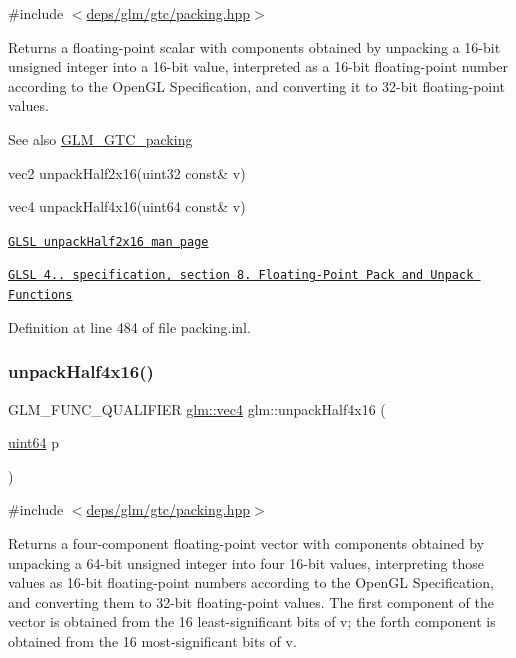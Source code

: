 {\ttfamily \#include $<$\hyperlink{gtc_2packing_8hpp}{deps/glm/gtc/packing.\+hpp}$>$}

Returns a floating-\/point scalar with components obtained by unpacking a 16-\/bit unsigned integer into a 16-\/bit value, interpreted as a 16-\/bit floating-\/point number according to the Open\+GL Specification, and converting it to 32-\/bit floating-\/point values.

\begin{DoxySeeAlso}{See also}
\hyperlink{group__gtc__packing}{G\+L\+M\+\_\+\+G\+T\+C\+\_\+packing} 

vec2 unpack\+Half2x16(uint32 const\& v) 

vec4 unpack\+Half4x16(uint64 const\& v) 

\href{http://www.opengl.org/sdk/docs/manglsl/xhtml/unpackHalf2x16.xml}{\tt G\+L\+SL unpack\+Half2x16 man page} 

\href{http://www.opengl.org/registry/doc/GLSLangSpec.4.20.8.pdf}{\tt G\+L\+SL 4.. specification, section 8. Floating-\/\+Point Pack and Unpack Functions} 
\end{DoxySeeAlso}


Definition at line 484 of file packing.\+inl.

\mbox{\label{group__gtc__packing_gaea526d6491ad40401eac34803984bf27}} 
\subsubsection{\texorpdfstring{unpack\+Half4x16()}{unpackHalf4x16()}}
{\footnotesize\ttfamily G\+L\+M\+\_\+\+F\+U\+N\+C\+\_\+\+Q\+U\+A\+L\+I\+F\+I\+ER \hyperlink{group__core__types_ga5881b1b022d7fd1b7218f5916532dd02}{glm\+::vec4} glm\+::unpack\+Half4x16 (\begin{DoxyParamCaption}\item[{\hyperlink{group__gtc__type__precision_gae3632bf9b37da66233d78930dd06378a}{uint64}}]{p }\end{DoxyParamCaption})}



{\ttfamily \#include $<$\hyperlink{gtc_2packing_8hpp}{deps/glm/gtc/packing.\+hpp}$>$}

Returns a four-\/component floating-\/point vector with components obtained by unpacking a 64-\/bit unsigned integer into four 16-\/bit values, interpreting those values as 16-\/bit floating-\/point numbers according to the Open\+GL Specification, and converting them to 32-\/bit floating-\/point values. The first component of the vector is obtained from the 16 least-\/significant bits of v; the forth component is obtained from the 16 most-\/significant bits of v.

